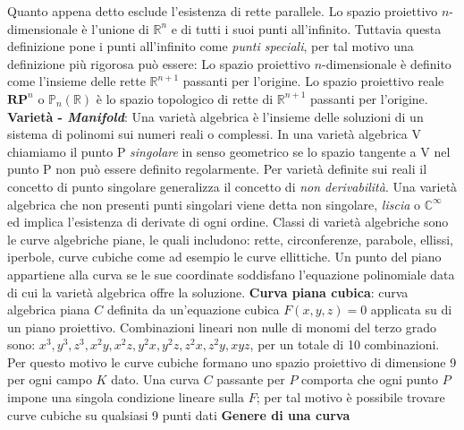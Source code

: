 \documentclass[a4paper,12pt]{tesiinfo}
\begin{document}
Quanto appena detto esclude l'esistenza di rette parallele.\newline
Lo spazio proiettivo $n$-dimensionale \`e l'unione di $\mathbb{R}^n$ e di tutti i suoi punti all'infinito. Tuttavia questa definizione pone i punti all'infinito come \textit{punti speciali}, per tal motivo una definizione pi\`u rigorosa pu\`o essere: Lo spazio proiettivo $n$-dimensionale \`e definito come l'insieme delle rette $\mathbb{R}^ {n+1}$ passanti per l'origine.\newline
Lo spazio proiettivo reale $\textbf{RP}^n$ o $\mathbb{P}_n(\mathbb{R})$ \`e lo spazio topologico di rette di $\mathbb{R}^ {n+1}$ passanti per l'origine.
\newline\newline
%
%
%
\textbf{Variet\`a - \textit{Manifold}}: Una variet\`a algebrica \`e l'insieme delle soluzioni di un sistema di polinomi sui numeri reali o complessi. In una variet\`a algebrica V chiamiamo il punto P \textit{singolare} in senso geometrico se lo spazio tangente a V nel punto P non pu\`o essere definito regolarmente. Per variet\`a definite sui reali il concetto di punto singolare generalizza il concetto di \textit{non derivabilit\`a}. Una variet\`a algebrica che non presenti punti singolari viene detta non singolare, \textit{liscia} o $\mathbb{C}^ {\infty}$ ed implica l'esistenza di derivate di ogni ordine.
Classi di variet\`a algebriche sono le curve algebriche piane, le quali includono: rette, circonferenze, parabole, ellissi, iperbole, curve cubiche come ad esempio le curve ellittiche.
Un punto del piano appartiene alla curva se le sue coordinate soddisfano l'equazione polinomiale data di cui la variet\`a algebrica offre la soluzione.
\newline\newline
%
%
%
\textbf{Curva piana cubica}: curva algebrica piana $C$ definita da un'equazione cubica $F(x, y, z) = 0$ applicata su di un piano proiettivo. Combinazioni lineari non nulle di monomi del terzo grado sono: $x^3, y^3, z^3, x^2y, x^2z, y^2x, y^2z, z^2x, z^2y, xyz$, per un totale di 10 combinazioni. Per questo motivo le curve cubiche formano uno spazio proiettivo di dimensione 9 per ogni campo $K$ dato.
Una curva $C$ passante per $P$ comporta che ogni punto $P$ impone una singola condizione lineare sulla $F$; per tal motivo \`e possibile trovare curve cubiche su qualsiasi 9 punti dati
\newline\newline
%
%
%
\textbf{Genere di una curva}
\newline\newline
\end{document}
